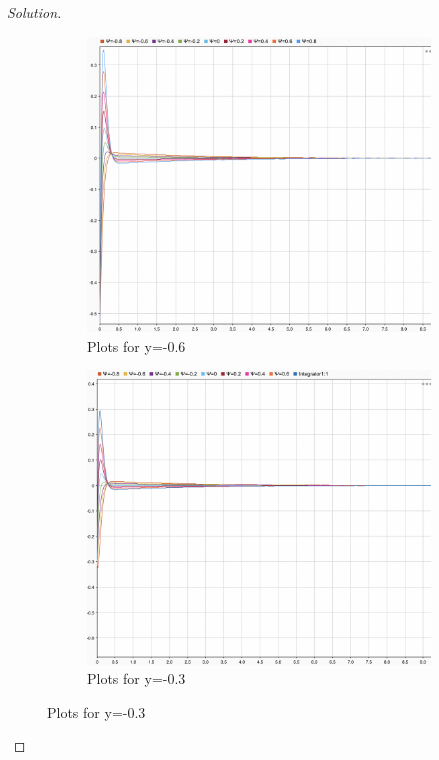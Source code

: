 \documentclass{article}
\begin{document}
\begin{proof}[Solution]
 \begin{figure}
    \centering
    \begin{subfigure}{0.4\linewidth}
      \includegraphics[width=\linewidth]{img7.png}
      \caption{Plots for y=-0.6}
    \end{subfigure}
    \begin{subfigure}{0.4\linewidth}
      \includegraphics[width=\linewidth]{img8.png}
      \caption{Plots for y=-0.3}
    \end{subfigure}

\end{figure}
\end{proof}
\end{document}
